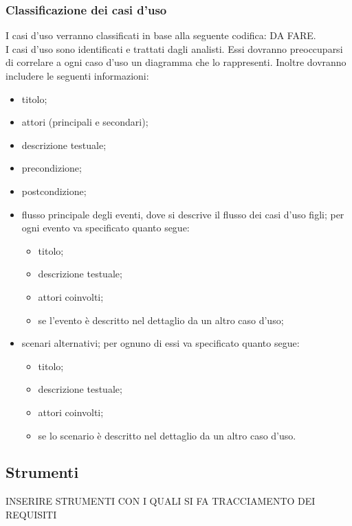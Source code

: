 		\subsubsection{Classificazione dei casi d'uso}
			I casi d'uso verranno classificati in base alla seguente codifica: DA FARE.\\
			I casi d'uso sono identificati e trattati dagli analisti. Essi dovranno preoccuparsi di correlare a ogni caso d'uso un diagramma che lo rappresenti. Inoltre dovranno includere le seguenti informazioni:
			\begin{itemize}
				\item titolo;
				\item attori (principali e secondari);
				\item descrizione testuale;
				\item precondizione;
				\item postcondizione;
				\item flusso principale degli eventi, dove si descrive il flusso dei casi d'uso figli; per ogni evento va specificato quanto segue:
				\begin{itemize}
					\item titolo;
					\item descrizione testuale;
					\item attori coinvolti;
					\item se l’evento è descritto nel dettaglio da un altro caso d’uso;
				\end{itemize}
				\item scenari alternativi; per ognuno di essi va specificato quanto segue:
				\begin{itemize}
					\item titolo;
					\item descrizione testuale;
					\item attori coinvolti;
					\item se lo scenario è descritto nel dettaglio da un altro caso d’uso.
				\end{itemize}
			\end{itemize}
	\subsection{Strumenti}
		INSERIRE STRUMENTI CON I QUALI SI FA TRACCIAMENTO DEI REQUISITI